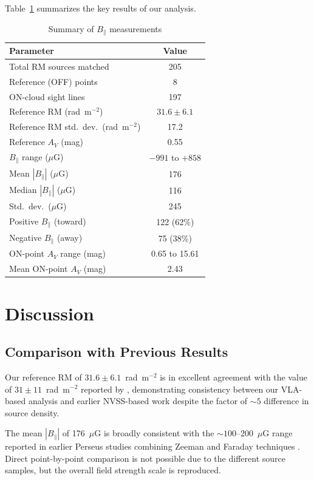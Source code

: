 \documentclass[twocolumn]{aastex701}
\begin{document}
Table~\ref{tab:summary} summarizes the key results of our analysis.

\begin{table}[t]
\centering
\caption{Summary of $B_\parallel$ measurements}
\label{tab:summary}
\begin{tabular}{lc}
\toprule
Parameter & Value \\
\midrule
Total RM sources matched & 205 \\
Reference (OFF) points & 8 \\
ON-cloud sight lines & 197 \\
\midrule
Reference RM (rad~m$^{-2}$) & $31.6 \pm 6.1$ \\
Reference RM std.\ dev.\ (rad~m$^{-2}$) & 17.2 \\
Reference $A_V$ (mag) & 0.55 \\
\midrule
$B_\parallel$ range ($\mu$G) & $-991$ to $+858$ \\
Mean $|B_\parallel|$ ($\mu$G) & 176 \\
Median $|B_\parallel|$ ($\mu$G) & 116 \\
Std.\ dev.\ ($\mu$G) & 245 \\
\midrule
Positive $B_\parallel$ (toward) & 122 (62\%) \\
Negative $B_\parallel$ (away) & 75 (38\%) \\
\midrule
ON-point $A_V$ range (mag) & 0.65 to 15.61 \\
Mean ON-point $A_V$ (mag) & 2.43 \\
\bottomrule
\end{tabular}
\end{table}

\section{Discussion}
\label{sec:discussion}

\subsection{Comparison with Previous Results}

Our reference RM of $31.6 \pm 6.1$~rad~m$^{-2}$ is in excellent agreement with the value of $31 \pm 11$~rad~m$^{-2}$ reported by \citet{tahani2018}, demonstrating consistency between our VLA-based analysis and earlier NVSS-based work despite the factor of $\sim 5$ difference in source density.

The mean $|B_\parallel|$ of 176~$\mu$G is broadly consistent with the $\sim 100$--200~$\mu$G range reported in earlier Perseus studies combining Zeeman and Faraday techniques \citep{tahani2018,tahani2022b}. Direct point-by-point comparison is not possible due to the different source samples, but the overall field strength scale is reproduced.
\end{document}
